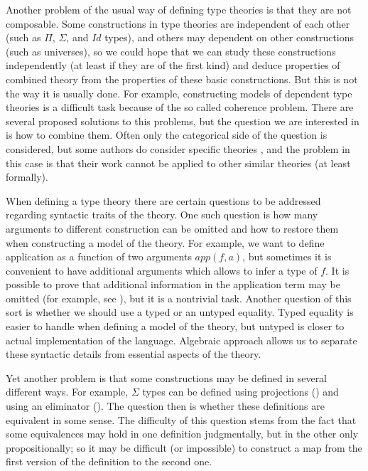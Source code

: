 \documentclass{elsarticle}
\theoremstyle{definition}
\theoremstyle{remark}
\numberwithin{figure}{section}
\begin{document}
Another problem of the usual way of defining type theories is that they are not composable.
Some constructions in type theories are independent of each other (such as $\Pi$, $\Sigma$, and $Id$ types),
and others may dependent on other constructions (such as universes),
so we could hope that we can study these constructions independently (at least if they are of the first kind)
and deduce properties of combined theory from the properties of these basic constructions.
But this is not the way it is usually done.
For example, constructing models of dependent type theories is a difficult task because of the so called coherence problem.
There are several proposed solutions to this problems, but the question we are interested in is how to combine them.
Often only the categorical side of the question is considered,
but some authors do consider specific theories \cite{streicher,pitts},
and the problem in this case is that their work cannot be applied to other similar theories (at least formally).

When defining a type theory there are certain questions to be addressed regarding syntactic traits of the theory.
One such question is how many arguments to different construction can be omitted and how to restore them when constructing a model of the theory.
For example, we want to define application as a function of two arguments $app(f,a)$, but sometimes it is convenient to have additional arguments which allows to infer a type of $f$.
It is possible to prove that additional information in the application term may be omitted (for example, see \cite{streicher}), but it is a nontrivial task.
Another question of this sort is whether we should use a typed or an untyped equality.
Typed equality is easier to handle when defining a model of the theory, but untyped is closer to actual implementation of the language.
Algebraic approach allows us to separate these syntactic details from essential aspects of the theory.

Yet another problem is that some constructions may be defined in several different ways.
For example, $\Sigma$ types can be defined using projections () and using an eliminator ().
The question then is whether these definitions are equivalent in some sense.
The difficulty of this question stems from the fact that some equivalences may hold in one definition judgmentally, but in the other only propositionally;
so it may be difficult (or impossible) to construct a map from the first version of the definition to the second one.
\end{document}
